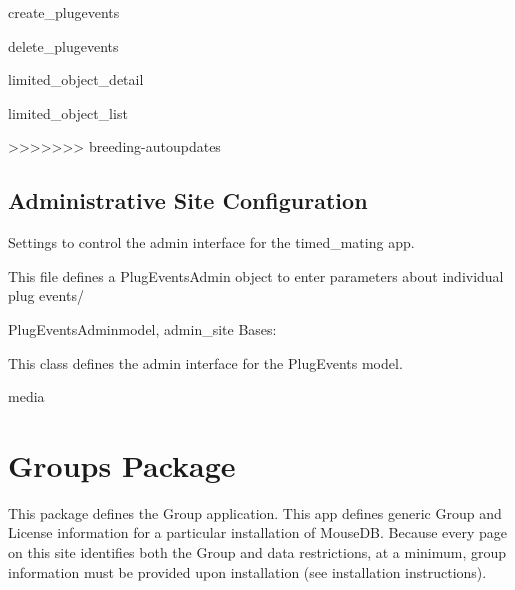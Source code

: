 \documentclass[letterpaper,10pt,english]{sphinxmanual}
\begin{document}
\hypertarget{timed\_mating.urls.create\_plugevents}{}\begin{memberdesc}{create\_plugevents}\end{memberdesc}

\hypertarget{timed\_mating.urls.delete\_plugevents}{}\begin{memberdesc}{delete\_plugevents}\end{memberdesc}

\hypertarget{timed\_mating.urls.limited\_object\_detail}{}\begin{memberdesc}{limited\_object\_detail}\end{memberdesc}

\hypertarget{timed\_mating.urls.limited\_object\_list}{}\begin{memberdesc}{limited\_object\_list}\end{memberdesc}
>>>>>>> breeding-autoupdates


\subsection{Administrative Site Configuration}
\hypertarget{module-timed\_mating.admin}{}
\modulesynopsis{}
Settings to control the admin interface for the timed\_mating app.

This file defines a PlugEventsAdmin object to enter parameters about individual plug events/

\hypertarget{timed\_mating.admin.PlugEventsAdmin}{}\begin{classdesc}{PlugEventsAdmin}{model, admin\_site}
Bases: 

This class defines the admin interface for the PlugEvents model.

\hypertarget{timed\_mating.admin.PlugEventsAdmin.media}{}\begin{memberdesc}{media}\end{memberdesc}
\end{classdesc}


\section{Groups Package}
\hypertarget{module-groups}{}
\modulesynopsis{}
This package defines the Group application.
This app defines generic Group and License information for a particular installation of MouseDB.  
Because every page on this site identifies both the Group and data restrictions, at a minimum, group information must be provided upon installation (see installation instructions).
\end{document}
